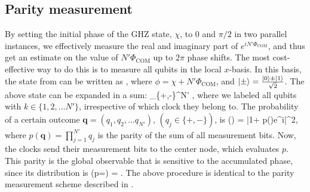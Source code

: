 \subsection{Parity measurement}
By setting the initial phase of the GHZ state, $\chi$, to $0$ and $\pi/2$ in
two parallel instances, we effectively measure the real and imaginary part of
$e^{iN'\Phi_\mathrm{COM}}$, and thus get an estimate on the value of
$N'\Phi_\mathrm{COM}$ up to $2\pi$ phase shifts. The most cost-effective way to
do this is to measure all qubits in the local $x$-basis. In this basis, the
state from  can be written as
\bel
	,
\eel
where $\phi = \chi + N'\Phi_\mathrm{COM}$, and $| \pm \rangle = \frac{| 0 \rangle \pm
| 1 \rangle}{\sqrt{2}}$. The above state can be expanded in a sum:
\bel
	\sum_{\in\{+,-\}^{\times N'}}
	\left[ \left(\prod_{j=1}^{N'}q_j\right) + e^{i\phi}\right]
	,
\eel
where we labeled all qubits with $k\in\{1,2,\dots N'\}$, irrespective of which
clock they belong to.
The probability of a certain outcome $\mathbf{q} = (q_1, q_2, \dots
q_{N'})$, $(q_j \in\{+,-\})$, is
\bel
	\PP() =  |1+ p()e^{i\phi}|^2,
\eel
where $p(\mathbf{q}) = \prod_{j=1}^{N'}q_j$ is the parity of the sum of all
measurement bits. Now, the clocks send their measurement bits to the center
node, which evaluates $p$.
This parity is the global observable that is sensitive to the accumulated phase,
since its distribution is
\bel
	\PP(p=\pm) = .
\eel
The above procedure is identical to the parity measurement scheme described in
\cite{Bollinger1996}.

